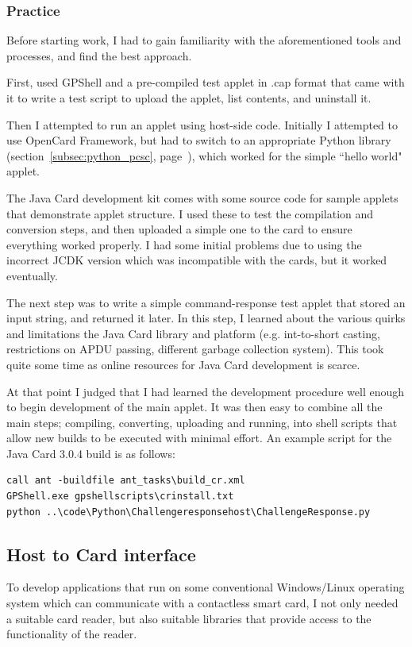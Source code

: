 \documentclass[12pt,a4paper]{article}
\begin{document}
\subsubsection{Practice}
Before starting work, I had to gain familiarity with the aforementioned tools and processes, and find the best approach.

First, used GPShell and a pre-compiled test applet in .cap format that came with it to write a test script to upload the applet, list contents, and  uninstall it.

Then I attempted to run an applet using host-side code. Initially I attempted to use OpenCard Framework, but had to switch to an appropriate Python library (section~\ref{subsec:python_pcsc}, page~\pageref{subsec:python_pcsc}), which worked for the simple ``hello world" applet.

The Java Card development kit comes with some source code for sample applets that demonstrate applet structure. I used these to test the compilation and conversion steps, and then uploaded a simple one to the card to ensure everything worked properly. I had some initial problems due to using the incorrect JCDK version which was incompatible with the cards, but it worked eventually.

The next step was to write a simple command-response test applet that stored an input string, and returned it later. In this step, I learned about the various quirks and limitations the Java Card library and platform (e.g. int-to-short casting, restrictions on APDU passing, different garbage collection system). This took quite some time as online resources for Java Card development is scarce.

At that point I judged that I had learned the development procedure well enough to begin development of the main applet. It was then easy to combine all the main steps; compiling, converting, uploading and running, into shell scripts that allow new builds to be executed with minimal effort. An example script for the Java Card 3.0.4 build is as follows:
\begin{verbatim}
call ant -buildfile ant_tasks\build_cr.xml
GPShell.exe gpshellscripts\crinstall.txt
python ..\code\Python\Challengeresponsehost\ChallengeResponse.py
\end{verbatim}

\subsection{Host to Card interface}
To develop applications that run on some conventional Windows/Linux operating system which can communicate with a contactless smart card, I not only needed a suitable card reader, but also suitable libraries that provide access to the functionality of the reader.
\end{document}
